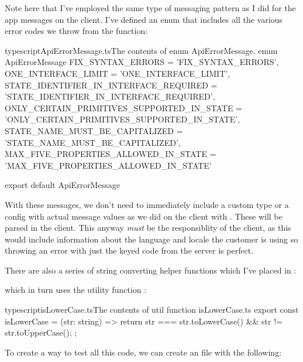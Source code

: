 \documentclass[a4paper,headinclude=on,footinclude=on,12pt,oneside]{scrbook}
\begin{document}
Note here that I've employed the same type of messaging pattern as I did for the app messages on the client. I've defined an  enum that includes all the various error codes we throw from the  function:

\begin{codeInput}{typescript}{ApiErrorMessage.ts}{The contents of enum ApiErrorMessage.}
  enum ApiErrorMessage {
    FIX_SYNTAX_ERRORS = 'FIX_SYNTAX_ERRORS',
    ONE_INTERFACE_LIMIT = 'ONE_INTERFACE_LIMIT',
    STATE_IDENTIFIER_IN_INTERFACE_REQUIRED = 'STATE_IDENTIFIER_IN_INTERFACE_REQUIRED',
    ONLY_CERTAIN_PRIMITIVES_SUPPORTED_IN_STATE = 'ONLY_CERTAIN_PRIMITIVES_SUPPORTED_IN_STATE',
    STATE_NAME_MUST_BE_CAPITALIZED = 'STATE_NAME_MUST_BE_CAPITALIZED',
    MAX_FIVE_PROPERTIES_ALLOWED_IN_STATE = 'MAX_FIVE_PROPERTIES_ALLOWED_IN_STATE'
}

export default ApiErrorMessage
\end{codeInput}

With these messages, we don't need to immediately include a custom type or a config with actual message values as we did on the client with . These  will be parsed in the client. This anyway \textit{must} be the responsiblity of the client, as this would include information about the language and locale the customer is using so throwing an error with just the keyed code from the server is perfect.

There are also a series of string converting helper functions which I've placed in :


which in turn uses the utility function :

\begin{codeInput}{typescript}{isLowerCase.ts}{The contents of util function isLowerCase.ts}
export const isLowerCase = (str: string) => {
  return str === str.toLowerCase() && str != str.toUpperCase();
};  
\end{codeInput}


To create a way to test all this code, we can create an  file with the following:

\end{document}
